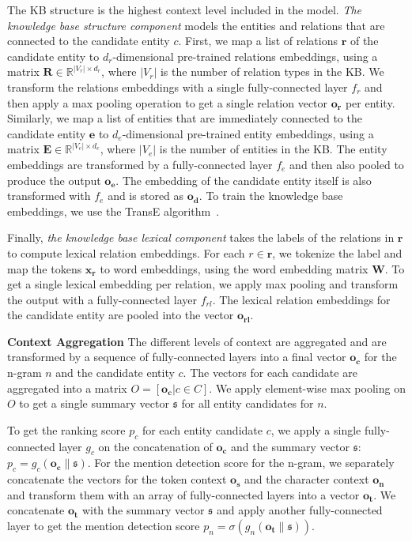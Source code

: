 \documentclass[11pt,a4paper]{article}
\begin{document}
The KB structure is the highest context level included in the model. \textit{The knowledge base structure component} models the entities and relations that are connected to the candidate entity $c$. First, we map a list of relations $\mathbf{r}$ of the candidate entity to $d_r$-dimensional pre-trained relations embeddings, using a matrix $\mathbf{R} \in \mathbb{R}^{|V_r| \times d_r}$, where $|V_r|$ is the number of relation types in the KB. We transform the relations embeddings with a single fully-connected layer $f_r$ and then apply a max pooling operation to get a single relation vector $\mathbf{o_r}$ per entity. Similarly, we map a list of entities that are immediately connected to the candidate entity $\mathbf{e}$ to $d_e$-dimensional pre-trained entity embeddings, using a matrix $\mathbf{E} \in \mathbb{R}^{|V_e| \times d_e}$, where $|V_e|$ is the number of entities in the KB. The entity embeddings are transformed by a fully-connected layer $f_e$ and then also pooled to produce the output $\mathbf{o_e}$. The embedding of the candidate entity itself is also transformed with $f_e$ and is stored as $\mathbf{o_d}$. To train the knowledge base embeddings, we use the TransE algorithm~\citep{Bordes2013}.

Finally, \textit{the knowledge base lexical component} takes the labels of the relations in $\mathbf{r}$ to compute lexical relation embeddings. For each $r \in \mathbf{r}$, we tokenize the label and map the tokens $\mathbf{x_r}$ to word embeddings, using the word embedding matrix $\mathbf{W}$. To get a single lexical embedding per relation, we apply max pooling and transform the output with a fully-connected layer $f_{rl}$. The lexical relation embeddings for the candidate entity are pooled into the vector $\mathbf{o_{rl}}$.

\textbf{Context Aggregation} The different levels of context are aggregated and are transformed by a sequence of fully-connected layers into a final vector $\mathbf{o_c}$ for the n-gram $n$ and the candidate entity $c$.
The vectors for each candidate are aggregated into a matrix $O = [\mathbf{o_c}| c \in C]$. We apply element-wise max pooling on $O$ to get a single summary vector $\mathfrak{s}$ for all entity candidates for $n$. 

To get the ranking score $p_c$ for each entity candidate $c$, we apply a single fully-connected layer $g_c$ on the concatenation of $\mathbf{o_c}$ and the summary vector $\mathfrak{s} $: $p_c = g_c(\mathbf{o_c} \| \mathfrak{s} )$.
For the mention detection score for the n-gram, we separately concatenate the vectors for the token context $\mathbf{o_s}$ and the character context $\mathbf{o_n}$ and transform them with an array of fully-connected layers into a vector $\mathbf{o_t}$. We concatenate $\mathbf{o_t}$ with the summary vector $\mathfrak{s}$ and apply another fully-connected layer to get the mention detection score $p_n = \sigma(g_n(\mathbf{o_t} \| \mathfrak{s}))$.
\end{document}
